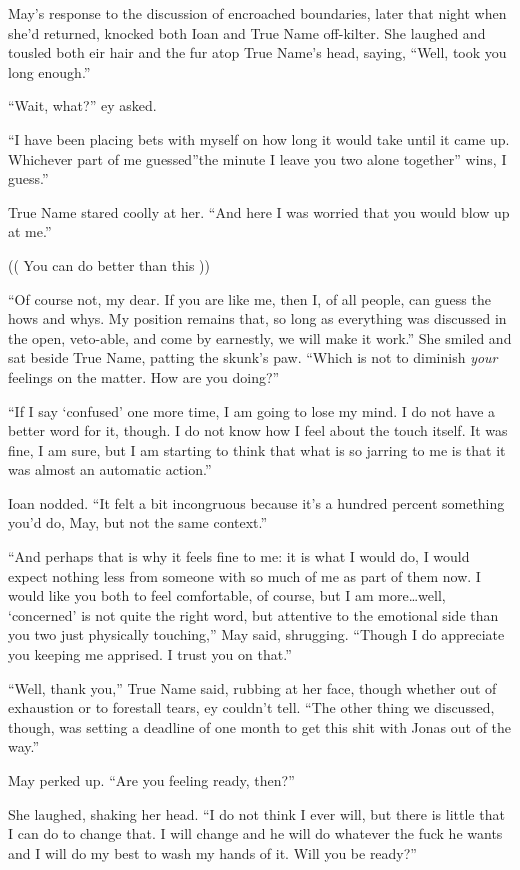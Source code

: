 May's response to the discussion of encroached boundaries, later that night when she'd returned, knocked both Ioan and True Name off-kilter. She laughed and tousled both eir hair and the fur atop True Name's head, saying, ``Well, took you long enough.''

``Wait, what?'' ey asked.

``I have been placing bets with myself on how long it would take until it came up. Whichever part of me guessed''the minute I leave you two alone together'' wins, I guess.''

True Name stared coolly at her. ``And here I was worried that you would blow up at me.''

(( You can do better than this ))

``Of course not, my dear. If you are like me, then I, of all people, can guess the hows and whys. My position remains that, so long as everything was discussed in the open, veto-able, and come by earnestly, we will make it work.'' She smiled and sat beside True Name, patting the skunk's paw. ``Which is not to diminish \emph{your} feelings on the matter. How are you doing?''

``If I say `confused' one more time, I am going to lose my mind. I do not have a better word for it, though. I do not know how I feel about the touch itself. It was fine, I am sure, but I am starting to think that what is so jarring to me is that it was almost an automatic action.''

Ioan nodded. ``It felt a bit incongruous because it's a hundred percent something you'd do, May, but not the same context.''

``And perhaps that is why it feels fine to me: it is what I would do, I would expect nothing less from someone with so much of me as part of them now. I would like you both to feel comfortable, of course, but I am more\ldots well, `concerned' is not quite the right word, but attentive to the emotional side than you two just physically touching,'' May said, shrugging. ``Though I do appreciate you keeping me apprised. I trust you on that.''

``Well, thank you,'' True Name said, rubbing at her face, though whether out of exhaustion or to forestall tears, ey couldn't tell. ``The other thing we discussed, though, was setting a deadline of one month to get this shit with Jonas out of the way.''

May perked up. ``Are you feeling ready, then?''

She laughed, shaking her head. ``I do not think I ever will, but there is little that I can do to change that. I will change and he will do whatever the fuck he wants and I will do my best to wash my hands of it. Will you be ready?''


